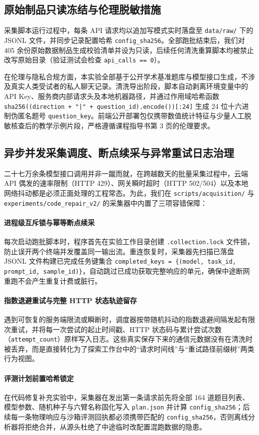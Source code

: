 \subsection{原始制品只读冻结与伦理脱敏措施}

采集脚本运行过程中，每条 API 请求均以追加写模式实时落盘至 \texttt{data/raw/} 下的 JSONL 文件，并同步记录配置哈希 \texttt{config\_sha256}。全部跑批结束后，我们对 405 余份原始数据制品生成校验清单并设为只读，后续任何清洗重算脚本均被禁止改写原始目录（验证测试会检查 \texttt{api\_calls == 0}）。

在伦理与隐私合规方面，本实验全部基于公开学术基准题库与模型接口生成，不涉及真实人类受试者的私人聊天记录。清洗导出阶段，脚本自动剥离环境变量中的 API Key、服务商内部请求头及本地机器路径，并通过作用域哈希函数 \texttt{sha256((direction + "|" + question\_id).encode())[:24]} 生成 24 位十六进制伪匿名题号 \texttt{question\_key}。前端公开部署包仅携带数值统计特征与少量人工脱敏核查后的教学示例片段，严格遵循课程指导书第 3 页的伦理要求。

\subsection{异步并发采集调度、断点续采与异常重试日志治理}

二十七万余条模型接口调用并非一蹴而就，在跨越数天的批量采集过程中，云端 API 偶发的速率限制（HTTP 429）、网关瞬时超时（HTTP 502/504）以及本地网络抖动都是必须正面处理的工程常态。为此，我们在 \texttt{scripts/acquisition/} 与 \texttt{experiments/code\_repair\_v2/} 的采集器中内置了三项容错保障：

\paragraph{进程级互斥锁与幂等断点续采}每次启动跑批脚本时，程序首先在实验工作目录创建 \texttt{.collection.lock} 文件锁，防止误开两个终端并发覆盖同一输出流。重连恢复时，采集器先扫描已落盘 JSONL 文件构建已完成任务键集合 \texttt{completed\_keys = \{(model, task\_id, prompt\_id, sample\_id)\}}，自动跳过已成功获取完整响应的单元，确保中途断网重跑不会产生重复计费或脏行。

\paragraph{指数退避重试与完整 HTTP 状态轨迹留存}遇到可恢复的服务端限流或瞬断时，调度器按带随机抖动的指数退避间隔发起有限次重试，并将每一次尝试的起止时间戳、HTTP 状态码与累计尝试次数（\texttt{attempt\_count}）原样写入日志。这些真实保存下来的通信元数据没有在清洗时被丢弃，而是直接转化为了探索工作台中的“请求时间线”与“重试路径前缀树”两类行为视图。

\paragraph{评测计划前置哈希锁定}在代码修复补充实验中，采集器在发出第一条请求前先将全部 164 道题目列表、模型参数、随机种子与六臂名称固化写入 \texttt{plan.json} 并计算 \texttt{config\_sha256}；后续每一条物理响应与沙箱评测回执都必须携带匹配的 \texttt{config\_sha256}，否则离线分析器将拒绝合并，从源头杜绝了中途临时改配置混跑数据的隐患。
